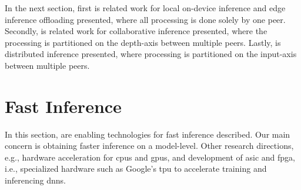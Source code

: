 In the next section, first is related work for local on-device inference and edge inference offloading presented, where all processing is done solely by one peer. Secondly, is related work for collaborative inference presented, where the processing is partitioned on the depth-axis between multiple peers. Lastly, is distributed inference presented, where processing is partitioned on the input-axis between multiple peers. 
\section{Fast Inference} \label{sec:ei-fast-inference}
In this section, are enabling technologies for fast inference described. Our main concern is obtaining faster inference on a model-level. Other research directions, e.g., hardware acceleration for \gls{cpu}s and \gls{gpu}s, and development of \gls{asic} and \gls{fpga}, i.e., specialized hardware such as Google's \gls{tpu} to accelerate training and inferencing \gls{dnn}s. 

